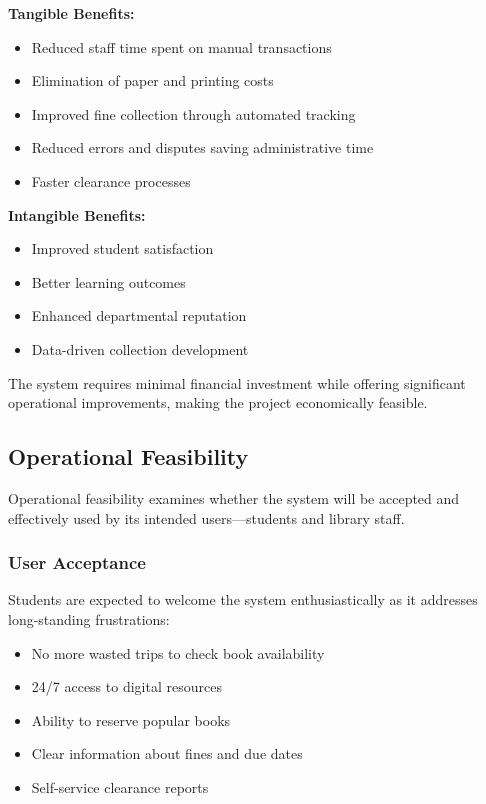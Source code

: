 \documentclass[12pt,a4paper]{report}
\begin{document}
\textbf{Tangible Benefits:}
\begin{itemize}
    \item Reduced staff time spent on manual transactions
    \item Elimination of paper and printing costs
    \item Improved fine collection through automated tracking
    \item Reduced errors and disputes saving administrative time
    \item Faster clearance processes
\end{itemize}

\newpage

\textbf{Intangible Benefits:}
\begin{itemize}
    \item Improved student satisfaction
    \item Better learning outcomes
    \item Enhanced departmental reputation
    \item Data-driven collection development
\end{itemize}

The system requires minimal financial investment while offering significant operational improvements, making the project economically feasible.

\subsection{Operational Feasibility}
\label{subsec:operational}

Operational feasibility examines whether the system will be accepted and effectively used by its intended users—students and library staff.

\subsubsection{User Acceptance}

Students are expected to welcome the system enthusiastically as it addresses long-standing frustrations:

\begin{itemize}
    \item No more wasted trips to check book availability
    \item 24/7 access to digital resources
    \item Ability to reserve popular books
    \item Clear information about fines and due dates
    \item Self-service clearance reports
\end{itemize}
\end{document}
